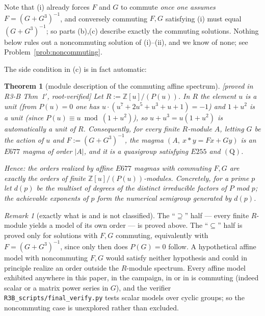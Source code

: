 \documentclass[11pt]{article}
\theoremstyle{plain}
\newtheorem{theorem}{Theorem}[section]
\theoremstyle{definition}
\theoremstyle{remark}
\newtheorem*{remark*}{Remark}
\numberwithin{equation}{section}
\newcommand{\Z}{\mathbb{Z}}
\newcommand{\op}{\mathbin{*}}
\newcommand{\statusbox}[1]{{\small\sloppy\textsf{[#1]}}}
\newcommand{\PROVED}[1]{\statusbox{proved in #1, root-verified}}
\begin{document}
Note that (i) already forces $F$ and $G$ to commute \emph{once one assumes}
$F = (G+G^3)^{-1}$, and conversely commuting $F,G$ satisfying (i) must equal $(G+G^3)^{-1}$;
so parts (b),(c) describe exactly the commuting solutions. Nothing below rules out a
noncommuting solution of (i)--(ii), and we know of none; see
Problem~\ref{prob:noncommuting}.

The side condition in (c) is in fact automatic:

\begin{theorem}[module description of the commuting affine spectrum]\label{thm:spectrum}
\PROVED{R3-B Thm~1$'$}
Let $R := \Z[u]/(P(u))$. In $R$ the element $u$ is a unit (from $P(u)=0$ one has
$u\cdot(u^7+2u^5+u^3+u+1) = -1$) and $1+u^2$ is a unit (since $P(u)\equiv u \bmod (1+u^2)$),
so $u+u^3 = u(1+u^2)$ is automatically a unit of $R$. Consequently, for every finite
$R$-module $A$, letting $G$ be the action of $u$ and $F := (G+G^3)^{-1}$, the magma
$(A,\ x\op y = Fx+Gy)$ is an $E677$ magma of order $|A|$, and it is a quasigroup satisfying
$E255$ and $(\mathrm{Q})$.

Hence: \emph{the orders realized by affine $E677$ magmas with commuting $F,G$ are exactly the
orders of finite $\Z[u]/(P(u))$-modules.} Concretely, for a prime $p$ let $d(p)$ be the
multiset of degrees of
the distinct irreducible factors of $P$ mod $p$; the achievable exponents of $p$ form the
numerical semigroup generated by $d(p)$.
\end{theorem}

\begin{remark*}[exactly what is and is not classified]
The ``$\supseteq$'' half --- every finite $R$-module yields a model of its own order --- is
proved above. The ``$\subseteq$'' half is proved only for solutions with $F,G$ commuting,
equivalently with $F = (G+G^3)^{-1}$, since only then does $P(G)=0$ follow. A hypothetical
affine model with noncommuting $F,G$ would satisfy neither hypothesis and could in principle
realize an order outside the $R$-module spectrum. Every affine model exhibited anywhere in
this paper, in the campaign, in \cite{blueprint} or in \cite{icarm} is commuting (indeed
scalar or a matrix power series in $G$), and the verifier
\texttt{R3B\_scripts\slash final\_verify.py} tests scalar models over cyclic groups; so the
noncommuting case is unexplored rather than excluded.
\end{remark*}
\end{document}
